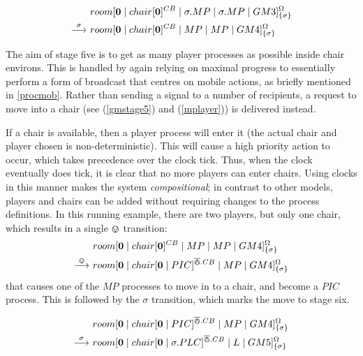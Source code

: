 \begin{equation}
\begin{aligned}
& {room}[ \textbf{0} \;|\; {chair}[ \textbf{0} ]^{CB} \;|\; 
   \sigma.MP \;|\; \sigma.MP \;|\;
   GM3 ]^{\Omega}_{\{\sigma\}} \\
\stackrel{\sigma}{\longrightarrow}\ & {room}[ \textbf{0} \;|\; {chair}[ \textbf{0} ]^{CB} \;|\; 
   MP \;|\; MP \;|\;
   GM4 ]^{\Omega}_{\{\sigma\}} \\
\end{aligned}
\end{equation}

The aim of stage five is to get as many player processes as possible
inside chair environs.  This is handled by again relying on maximal
progress to essentially perform a form of broadcast that centres on
mobile actions, as briefly mentioned in \ref{procmob}.  Rather than
sending a signal to a number of recipients, a request to move into a
chair (see (\ref{gmstage5}) and (\ref{mplayer})) is delivered instead.

If a chair is available, then a player process will enter it (the actual
chair and player chosen is non-deterministic).  This will cause a high
priority action to occur, which takes precedence over the clock tick.
Thus, when the clock eventually does tick, it is clear that no more
players can enter chairs. Using clocks in this manner makes the system
\emph{compositional}; in contrast to other models, players and chairs
can be added without requiring changes to the process definitions.  In
this running example, there are two players, but only one chair, which
results in a single $\varovee$ transition:
\begin{equation}
\begin{aligned}
& {room}[ \textbf{0} \;|\; {chair}[ \textbf{0} ]^{CB} \;|\; 
   MP \;|\; MP \;|\;
   GM4 ]^{\Omega}_{\{\sigma\}} \\
\stackrel{\varovee}{\longrightarrow}\ & {room}[ \textbf{0} \;|\; {chair}[ \textbf{0} \;|\; PIC ]^{\overline{\varowedge}.CB} \;|\; 
   MP \;|\;
   GM4 ]^{\Omega}_{\{\sigma\}} \\
\end{aligned}
\end{equation}
that causes one of the $MP$ processes to move in to a
chair, and become a $PIC$ process.  This is followed by the
$\sigma$ transition, which marks the move to stage six.

\begin{equation}
\begin{aligned}
&  {room}[ \textbf{0} \;|\; {chair}[ \textbf{0} \;|\; PIC ]^{\overline{\varowedge}.CB} \;|\; 
   MP \;|\;
   GM4 ]^{\Omega}_{\{\sigma\}} \\
\stackrel{\sigma}{\longrightarrow}\ & {room}[ \textbf{0} \;|\; {chair}[ \textbf{0} \;|\; \sigma.PLC ]^{\overline{\varowedge}.CB} \;|\; 
   L \;|\;
   GM5 ]^{\Omega}_{\{\sigma\}} \\
\end{aligned}
\end{equation}

